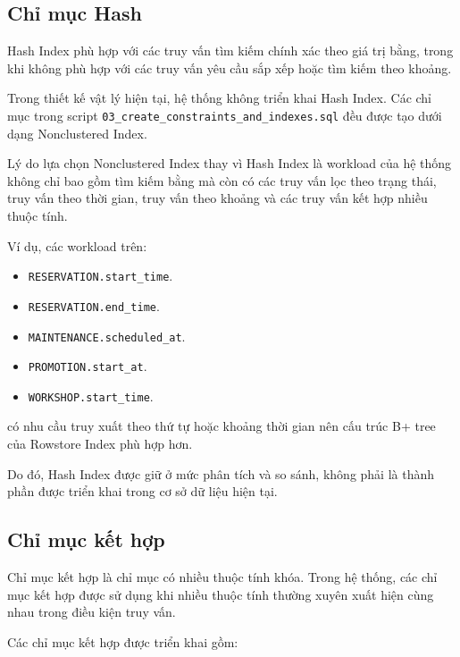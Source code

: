 \subsection{Chỉ mục Hash}

Hash Index phù hợp với các truy vấn tìm kiếm chính xác theo giá trị bằng,
trong khi không phù hợp với các truy vấn yêu cầu sắp xếp hoặc tìm kiếm theo
khoảng.

Trong thiết kế vật lý hiện tại, hệ thống không triển khai Hash Index.
Các chỉ mục trong script \texttt{03\_create\_constraints\_and\_indexes.sql}
đều được tạo dưới dạng Nonclustered Index.

Lý do lựa chọn Nonclustered Index thay vì Hash Index là workload của hệ
thống không chỉ bao gồm tìm kiếm bằng mà còn có các truy vấn lọc theo
trạng thái, truy vấn theo thời gian, truy vấn theo khoảng và các truy vấn
kết hợp nhiều thuộc tính.

Ví dụ, các workload trên:

\begin{itemize}
	\item \texttt{RESERVATION.start\_time}.
	\item \texttt{RESERVATION.end\_time}.
	\item \texttt{MAINTENANCE.scheduled\_at}.
	\item \texttt{PROMOTION.start\_at}.
	\item \texttt{WORKSHOP.start\_time}.
\end{itemize}

có nhu cầu truy xuất theo thứ tự hoặc khoảng thời gian nên cấu trúc
B+ tree của Rowstore Index phù hợp hơn.

Do đó, Hash Index được giữ ở mức phân tích và so sánh, không phải là thành
phần được triển khai trong cơ sở dữ liệu hiện tại.

\subsection{Chỉ mục kết hợp}

Chỉ mục kết hợp là chỉ mục có nhiều thuộc tính khóa. Trong hệ thống, các
chỉ mục kết hợp được sử dụng khi nhiều thuộc tính thường xuyên xuất hiện
cùng nhau trong điều kiện truy vấn.

Các chỉ mục kết hợp được triển khai gồm:

